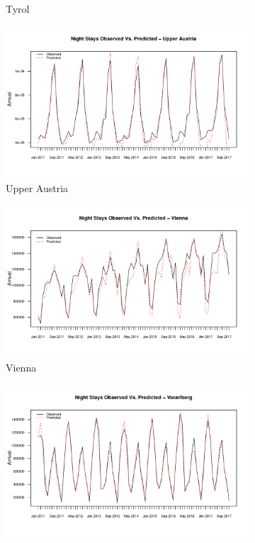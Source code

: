 \documentclass[a4paper,reqno,]{article}
\begin{document}
\begin{figure}[H]
\begin{subfigure}[b]{0.32\linewidth}
    \caption{Tyrol}
  \end{subfigure}
  \begin{subfigure}[b]{0.32\linewidth}
    \includegraphics[width=\linewidth]{images/SVR/UpperAustriaSpaceTimeSVR.pdf}
    \caption{Upper Austria}
  \end{subfigure}
  \begin{subfigure}[b]{0.32\linewidth}
    \includegraphics[width=\linewidth]{images/SVR/ViennaSpaceTimeSVR.pdf}
    \caption{Vienna}
  \end{subfigure}
  \begin{subfigure}[b]{0.32\linewidth}
    \includegraphics[width=\linewidth]{images/SVR/VorarlbergSpaceTimeSVR.pdf}

\end{subfigure}
\end{figure}
\end{document}

